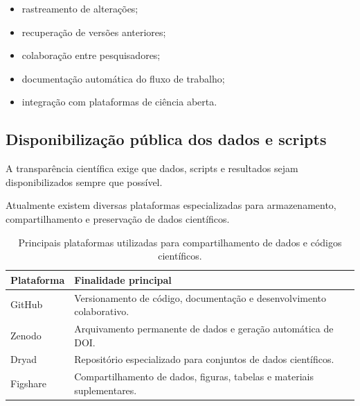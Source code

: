 \begin{itemize}
	\item rastreamento de alterações;
	\item recuperação de versões anteriores;
	\item colaboração entre pesquisadores;
	\item documentação automática do fluxo de trabalho;
	\item integração com plataformas de ciência aberta.
\end{itemize}

\subsection{Disponibilização pública dos dados e scripts}

A transparência científica exige que dados, scripts e resultados sejam
disponibilizados sempre que possível.

Atualmente existem diversas plataformas especializadas para armazenamento,
compartilhamento e preservação de dados científicos.

\begin{table}[H]
	\centering
	\caption{Principais plataformas utilizadas para compartilhamento de dados e códigos científicos.}
	\label{tab:repositorios_ciencia_aberta}
	
	\begin{tabular}{
			p{}
			p{}
		}
		
		\toprule
		
		\textbf{Plataforma} &
		\textbf{Finalidade principal}
		
		\\
		\midrule
		
		GitHub &
		Versionamento de código, documentação e desenvolvimento colaborativo.
		
		\\
		
		Zenodo &
		Arquivamento permanente de dados e geração automática de DOI.
		
		\\
		
		Dryad &
		Repositório especializado para conjuntos de dados científicos.
		
		\\
		
		Figshare &
		Compartilhamento de dados, figuras, tabelas e materiais suplementares.
		
		\\
		
		\bottomrule
		
	\end{tabular}
	
\end{table}

